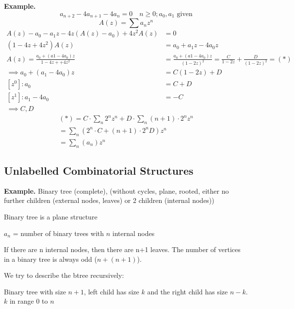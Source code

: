\textbf{Example.}
\[
    a_{n+2} - 4 a_{n+1} - 4 a_n = 0 \quad n ≥ 0;  a_0, a_1 \text{ given}
\]
\[
    A(z) = \sum a_n z^n
\]
\begin{align*}
    A(z) - a_0 - a_1 z - 4z (A(z)-a_0) + 4z^2 A(z) &= 0 \\
    (1-4z + 4z^2) A(z) &= a_0 + a_1 z - 4a_0 z \\
    A(z) = \frac{a_0 + (a1 - 4a_0)z}{1- 4z + + 4z^2} &= \frac{a_0 + (a1 - 4a_0)z}{(1-2z)^2}
    = \frac{C}{1-2z} + \frac{D}{(1-2z)^2} = (*)\\
    \implies a_0 + (a_1 - 4a_0)z &= C (1-2z) + D \\
    [z^0]: a_0 &= C+D \\
    [z^1]: a_1 - 4a_0 &= -C \\
    \implies C, D
\end{align*}
\begin{align*}
    (*) = C \cdot \sum_n 2^n z^n + D \cdot \sum_n (n+1) \cdot 2^n z^n \\
    = \sum_n \left(2^n \cdot C + (n+1)\cdot 2^n D\right) z^n \\
    = \sum_n (a_n) z^n
\end{align*}




\subsection{Unlabelled Combinatorial Structures}

\textbf{Example.}
Binary tree (complete), (without cycles, plane, rooted, either no further children (external nodes, leaves) or 2 children (internal nodes))


Binary tree is a plane structure

$a_n$ = number of binary trees with $n$ internal nodes

If there are n internal nodes, then there are n+1 leaves. The number of vertices in a binary tree is always odd ($n + (n+1)$).

We try to describe the btree recursively:

Binary tree with size $n+1$,
left child has size $k$ and the right child has size $n-k$.
$k$ in range $0$ to $n$

